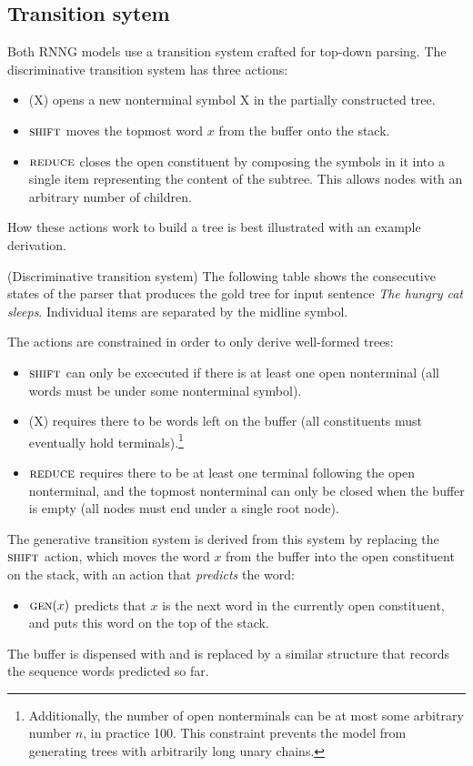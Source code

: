   \subsection{Transition sytem}
    Both RNNG models use a transition system crafted for top-down parsing. The discriminative transition system has three actions:
    \begin{itemize}
      \item \open(X) opens a new nonterminal symbol X in the partially constructed tree.
      \item $\textsc{shift}$ moves the topmost word $x$ from the buffer onto the stack.
      \item $\textsc{reduce}$ closes the open constituent by composing the symbols in it into a single item representing the content of the subtree. This allows nodes with an arbitrary number of children.
    \end{itemize}
    How these actions work to build a tree is best illustrated with an example derivation.

    \begin{example}{(Discriminative transition system)}
      \label{ex:disc-states}
      The following table shows the consecutive states of the parser that produces the gold tree for input sentence \textit{The hungry cat sleeps}. Individual items are separated by the midline symbol.
      
    \end{example}

     The actions are constrained in order to only derive well-formed trees:
    \begin{itemize}
      \item $\textsc{shift}$ can only be excecuted if there is at least one open nonterminal (all words must be under some nonterminal symbol).
      \item \open(X) requires there to be words left on the buffer (all constituents must eventually hold terminals).\footnote{Additionally, the number of open nonterminals can be at most some arbitrary number $n$, in practice 100. This constraint prevents the model from generating trees with arbitrarily long unary chains.}
      \item $\textsc{reduce}$ requires there to be at least one terminal following the open nonterminal, and the topmost nonterminal can only be closed when the buffer is empty (all nodes must end under a single root node).
    \end{itemize}
    The generative transition system is derived from this system by replacing the $\textsc{shift}$ action, which moves the word $x$ from the buffer into the open constituent on the stack, with an action that \textit{predicts} the word:
    \begin{itemize}
      \item $\textsc{gen}(x)$ predicts that $x$ is the next word in the currently open constituent, and puts this word on the top of the stack.
    \end{itemize}
    The buffer is dispensed with and is replaced by a similar structure that records the sequence words predicted so far.

